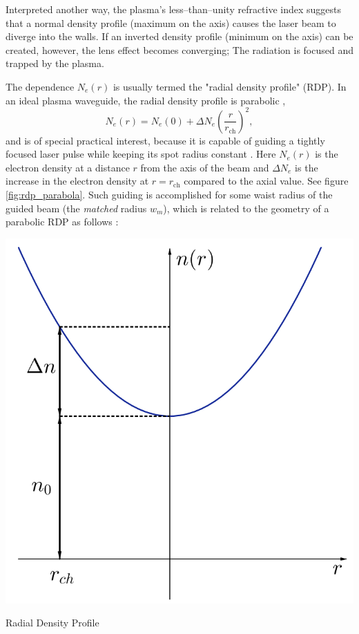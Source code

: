 \documentclass[../main.tex]{subfiles}
\begin{document}
Interpreted another way, the plasma's less--than--unity refractive index suggests that a normal density profile (maximum on the axis) causes the laser beam to diverge into the walls. If an inverted density profile (minimum on the axis) can be created, however, the lens effect becomes converging; The radiation is focused and trapped by the plasma.

The dependence $N_e(r)$ is usually termed the "radial density profile" (RDP). In an ideal plasma waveguide, the radial density profile is parabolic \cite{Sprangle1992PropagationPlasmas},
\begin{equation}
    N_e(r)=N_e(0)+\Delta N_e\left( \frac{r}{r_\text{ch}}\right)^2,
    \label{eq:rdp}
\end{equation}
and is of special practical interest, because it is capable of guiding a tightly focused laser pulse while keeping its spot radius constant \cite{Sprangle1992PropagationPlasmas,Esarey1997Self-focusingPlasmas}. Here $N_e(r)$ is the electron density at a distance $r$ from the axis of the beam and $\Delta N_e$ is the increase in the electron density at $r=r_\text{ch}$ compared to the axial value. See figure \ref{fig:rdp_parabola}. Such guiding is accomplished for some waist radius of the guided beam (the \textit{matched} radius $w_m$), which is related to the geometry of a parabolic RDP as follows \cite{Esarey1997Self-focusingPlasmas}:
\begin{marginfigure}
    \includegraphics[width=\marginparwidth]{figures/rdp.PNG}
    \caption{Radial Density Profile}
    \label{fig:rdp_parabola}
\end{marginfigure}
\end{document}
